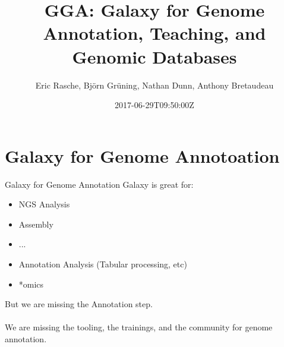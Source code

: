 \documentclass[12pt]{phage3slides} %
\title[Galaxy for Genome Annotation, Teaching, Databases]{GGA: Galaxy for Genome Annotation, Teaching, and Genomic Databases}
\author[ER, BG, ND, AB]{Eric Rasche, Bj\"orn Gr\"uning, Nathan Dunn, Anthony Bretaudeau}
\date{2017-06-29T09:50:00Z}
\begin{document}
\frame{\titlepage}




\section[GGA]{Galaxy for Genome Annotoation}
\begin{frame}{Galaxy for Genome Annotation}
    Galaxy is great for:
    \begin{itemize}
        \item NGS Analysis
        \item Assembly
        \item ...
        \item Annotation Analysis (Tabular processing, etc)
        \item *omics
    \end{itemize}
    But we are missing the Annotation step.\\\ \\
    We are missing the tooling, the
    trainings, and the community for genome annotation.
\end{frame}
\end{document}
